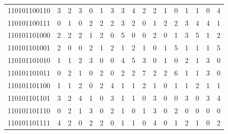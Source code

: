 \documentclass[10pt,a4paper]{article}
\begin{document}
\begin{longtable}{ |c|c|c|c|c|c|c|c|c|c|c|c|c|c|c|c|c| }
    110101100110              & 3                            & 2                                & 3                            & 0                              & 1   & 3   & 3   & 4   & 2   & 2   & 1   & 0   & 1   & 1   & 0   & 4   \\
    110101100111              & 0                            & 1                                & 0                            & 2                              & 2   & 2   & 3   & 2   & 0   & 1   & 2   & 2   & 3   & 4   & 4   & 1   \\
    110101101000              & 2                            & 2                                & 2                            & 1                              & 2   & 0   & 5   & 0   & 0   & 2   & 0   & 1   & 3   & 5   & 1   & 2   \\
    110101101001              & 2                            & 0                                & 0                            & 2                              & 1   & 2   & 1   & 2   & 1   & 0   & 1   & 5   & 1   & 1   & 1   & 5   \\
    110101101010              & 1                            & 1                                & 2                            & 3                              & 0   & 0   & 4   & 5   & 3   & 0   & 1   & 0   & 2   & 1   & 3   & 0   \\
    110101101011              & 0                            & 2                                & 1                            & 0                              & 2   & 0   & 2   & 2   & 7   & 2   & 2   & 6   & 1   & 1   & 3   & 0   \\
    110101101100              & 1                            & 1                                & 2                            & 0                              & 2   & 4   & 1   & 1   & 2   & 1   & 0   & 1   & 1   & 2   & 1   & 1   \\
    110101101101              & 3                            & 2                                & 4                            & 1                              & 0   & 3   & 1   & 1   & 0   & 3   & 0   & 0   & 3   & 0   & 3   & 4   \\
    110101101110              & 0                            & 2                                & 1                            & 3                              & 0   & 2   & 1   & 0   & 1   & 3   & 0   & 2   & 0   & 0   & 0   & 0   \\
    110101101111              & 4                            & 2                                & 0                            & 2                              & 2   & 0   & 1   & 1   & 0   & 4   & 0   & 1   & 2   & 1   & 0   & 2   \\

\end{longtable}
\end{document}
